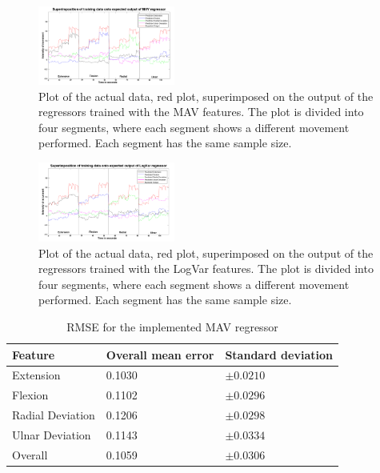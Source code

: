 	\begin{figure}[!thpb]
		\centering
		\includegraphics[width=0.4\textwidth]{figures/NewSuperPositionTestDataMAV}  %
		\caption{Plot of the actual data, red plot, superimposed on the output of the regressors trained with the MAV features. The plot is divided into four segments, where each segment shows a different movement performed. Each segment has the same sample size.}
		\label{fig:SuperPositionTrainingMAV}  %
	\end{figure}
	
	\begin{figure}[!thpb]
		\centering
		\includegraphics[width=0.4\textwidth]{figures/NewSuperPositionTestDataLogVar}  %
		\caption{Plot of the actual data, red plot, superimposed on the output of the regressors trained with the LogVar features. The plot is divided into four segments, where each segment shows a different movement performed. Each segment has the same sample size.}
		\label{fig:SuperPositionTrainingLogVar}  %
	\end{figure}
	
	\begin{table}[!thpb]
		\begin{center}
			\begin{tabular}{l l l}
				\hline
				\textbf{Feature} & \textbf{Overall mean error} & \textbf{Standard deviation}\\
				\hline
				Extension & 0.1030 & $\pm 0.0210$ \\
				Flexion & 0.1102 & $\pm 0.0296$ \\
				Radial Deviation & 0.1206 & $\pm 0.0298$ \\
				Ulnar Deviation & 0.1143 & $\pm 0.0334$ \\
				Overall & 0.1059 & $\pm 0.0306$ \\
				\hline
			\end{tabular}
			\caption{RMSE for the implemented MAV regressor}
		\end{center}
	\end{table}
	

